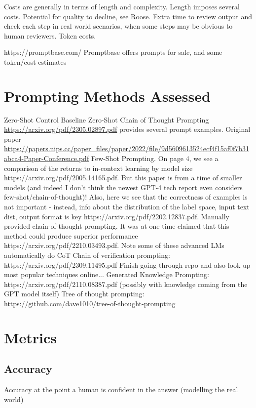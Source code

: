 \documentclass[11pt]{article}
\begin{document}
Costs are generally in terms of length and complexity.
Length imposes several costs. Potential for quality to decline, see Roose. Extra time to review output and check each step in real world scenarios, when some steps may be obvious to human reviewers. Token costs.

https://promptbase.com/
Promptbase offers prompts for sale, and some token/cost estimates

\section{Prompting Methods Assessed}

Zero-Shot Control Baseline
Zero-Shot Chain of Thought Prompting \url{https://arxiv.org/pdf/2305.02897.pdf} provides several prompt examples. Original paper \url{https://papers.nips.cc/paper_files/paper/2022/file/9d5609613524ecf4f15af0f7b31abca4-Paper-Conference.pdf}
Few-Shot Prompting. On page 4, we see a comparison of the returns to in-context learning by model size https://arxiv.org/pdf/2005.14165.pdf. But this paper is from a time of smaller models (and indeed I don't think the newest GPT-4 tech report even considers few-shot/chain-of-thought)! Also, here we see that the correctness of examples is not important - instead, info about the distribution of the label space, input text dist, output format is key https://arxiv.org/pdf/2202.12837.pdf.
Manually provided chain-of-thought prompting. It was at one time claimed that this method could produce superior performance https://arxiv.org/pdf/2210.03493.pdf. Note some of these advanced LMs automatically do CoT
Chain of verification prompting: https://arxiv.org/pdf/2309.11495.pdf
Finish going through repo and also look up most popular techniques online...
Generated Knowledge Prompting: https://arxiv.org/pdf/2110.08387.pdf (possibly with knowledge coming from the GPT model itself)
Tree of thought prompting: https://github.com/dave1010/tree-of-thought-prompting

\section{Metrics}

\subsection{Accuracy}

Accuracy at the point a human is confident in the answer (modelling the real world)
\end{document}
